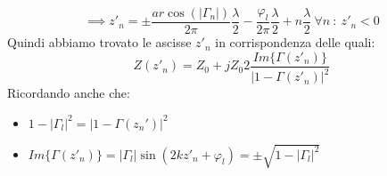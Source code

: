 \begin{equation*}
    \implies z'_n = \pm \frac{ar\cos(|\Gamma_n|)}{2\pi} \frac{\lambda}{2} - \frac{\varphi_l}{2\pi} \frac{\lambda}{2} + n \frac{\lambda}{2} \ \forall n \ : \ z'_n <0
\end{equation*}
Quindi abbiamo trovato le ascisse $z'_n$ in corrispondenza delle quali:
\begin{equation*}
    Z(z'_n) = Z_0 + j Z_0 2 \frac{Im\{\Gamma(z'_n)\}}{|1 - \Gamma(z'_n)|^2}
\end{equation*}
Ricordando anche che:
\begin{itemize}
    \item $1 - |\Gamma_l|^2 = |1 - \Gamma(z_n')|^2 $
    \item $Im\{\Gamma(z'_n)\} = |\Gamma_l| \sin(2kz'_n +\varphi_l) = \pm \sqrt{1 - |\Gamma_l|^2}$
\end{itemize}

